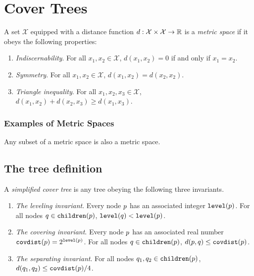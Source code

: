 \documentclass[../main.tex]{subfiles}
\newcommand{\set}[1]{\mathcal {#1}}
\newcommand{\dist}[2]{\distf({#1},{#2})}
\newcommand{\distf}{d}
\newcommand{\p}{\ensuremath p}
\newcommand{\q}{\ensuremath q}
\newcommand{\level}[1]{\ensuremath{\textup{\text{\ttfamily level}({#1})}}}
\newcommand{\children}[1]{\ensuremath{\textup{\text{\ttfamily children}({#1})}}}
\newcommand{\covdist}[1]{\ensuremath{\textup{\text{\ttfamily covdist}({#1})}}}
\begin{document}
\chapter{Cover Trees}

\begin{definition}
    A set $\set X$ equipped with a distance function $\distf : \set X \times \set X \to \R$ is a \emph{metric space} if it obeys the following properties:
    \begin{enumerate}
        \item \emph{Indiscernability}.  For all $x_1,x_2\in\set X$, $\dist{x_1}{x_2} = 0$ if and only if $x_1=x_2$.
        \item \emph{Symmetry}. For all $x_1,x_2\in\set X$, $\dist{x_1}{x_2} = \dist{x_2}{x_2}$.
        \item \emph{Triangle inequality}.  For all $x_1,x_2,x_3\in\set X$, $\dist{x_1}{x_2} + \dist{x_2}{x_3}\ge\dist{x_1}{x_3}$.
    \end{enumerate}
\end{definition}

\subsection{Examples of Metric Spaces}

\begin{example}
    Any subset of a metric space is also a metric space.
\end{example}


\section{The tree definition}

\begin{definition}
    A \emph{simplified cover tree} is any tree obeying the following three invariants.
    \begin{enumerate}
        \item \emph{The leveling invariant}.
        Every node $\p$ has an associated integer $\level\p$.
        For all nodes $\q\in\children\p$, $\level\q < \level\p$.
        \item \emph{The covering invariant}.
        Every node $\p$ has an associated real number $\covdist\p=2^{\level\p}$.
        For all nodes $\q\in\children\p$, $\dist \p \q \le \covdist\p$.
        \item \emph{The separating invariant}.
        For all nodes $\q_1,\q_2\in\children\p$, $\dist {\q_1} {\q_2} \le \covdist\p/4$.
    \end{enumerate}
\end{definition}
\end{document}
